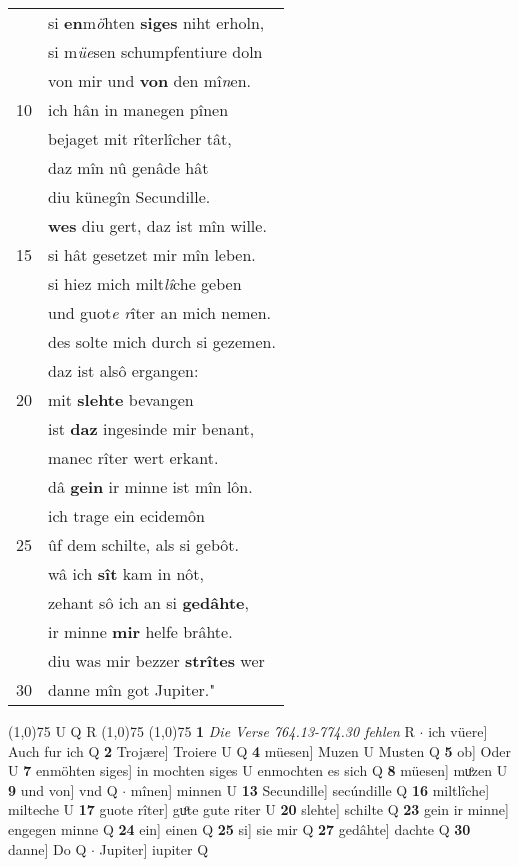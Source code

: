 \documentclass[8pt,a4paper,notitlepage]{article}
\begin{document}
\begin{table}[ht]
\begin{minipage}[t]{0.5\linewidth}
\begin{tabular}{rl}
 & si \textbf{en}m\textit{ö}hten \textbf{siges} niht erholn,\\ 
 & si m\textit{üe}sen schumpfentiure doln\\ 
 & von mir und \textbf{von} den mî\textit{n}en.\\ 
10 & ich hân in manegen pînen\\ 
 & bejaget mit rîterlîcher tât,\\ 
 & daz mîn nû genâde hât\\ 
 & diu künegîn Secundille.\\ 
 & \textbf{wes} diu gert, daz ist mîn wille.\\ 
15 & si hât gesetzet mir mîn leben.\\ 
 & si hiez mich milt\textit{lî}che geben\\ 
 & und guot\textit{e r}îter an mich nemen.\\ 
 & des solte mich durch si gezemen.\\ 
 & daz ist alsô ergangen:\\ 
20 & mit \textbf{slehte} bevangen\\ 
 & ist \textbf{daz} ingesinde mir benant,\\ 
 & manec rîter wert erkant.\\ 
 & dâ \textbf{gein} ir minne ist mîn lôn.\\ 
 & ich trage ein ecidemôn\\ 
25 & ûf dem schilte, als si gebôt.\\ 
 & wâ ich \textbf{sît} kam in nôt,\\ 
 & zehant sô ich an si \textbf{gedâhte},\\ 
 & ir minne \textbf{mir} helfe brâhte.\\ 
 & diu was mir bezzer \textbf{strîtes} wer\\ 
30 & danne mîn got Jupiter."\\ 
\end{tabular}
\scriptsize
\line(1,0){75} \newline
U Q R \newline
\line(1,0){75} \newline
\newline
\line(1,0){75} \newline
\textbf{1} \textit{Die Verse 764.13-774.30 fehlen} R   $\cdot$ ich vüere] Auch fur ich Q \textbf{2} Trojære] Troiere U Q \textbf{4} müesen] Muzen U Musten Q \textbf{5} ob] Oder U \textbf{7} enmöhten siges] in mochten siges U enmochten es sich Q \textbf{8} müesen] muͦzen U \textbf{9} und von] vnd Q  $\cdot$ mînen] minnen U \textbf{13} Secundille] secúndille Q \textbf{16} miltlîche] milteche U \textbf{17} guote rîter] guͦte gute riter U \textbf{20} slehte] schilte Q \textbf{23} gein ir minne] engegen minne Q \textbf{24} ein] einen Q \textbf{25} si] sie mir Q \textbf{27} gedâhte] dachte Q \textbf{30} danne] Do Q  $\cdot$ Jupiter] iupiter Q \newline
\end{minipage}
\end{table}
\end{document}
